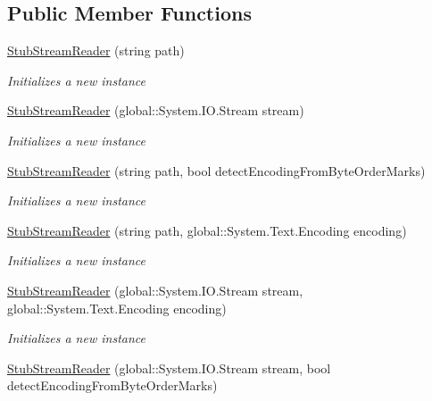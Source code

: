 \subsection*{Public Member Functions}
\begin{DoxyCompactItemize}
\item 
\hyperlink{class_system_1_1_i_o_1_1_fakes_1_1_stub_stream_reader_a5bb21911f4bb442b1e2476edf2af28b1}{Stub\-Stream\-Reader} (string path)
\begin{DoxyCompactList}\small\item\em Initializes a new instance\end{DoxyCompactList}\item 
\hyperlink{class_system_1_1_i_o_1_1_fakes_1_1_stub_stream_reader_a363441d31ffb0a17b02c0c676e2f003c}{Stub\-Stream\-Reader} (global\-::\-System.\-I\-O.\-Stream stream)
\begin{DoxyCompactList}\small\item\em Initializes a new instance\end{DoxyCompactList}\item 
\hyperlink{class_system_1_1_i_o_1_1_fakes_1_1_stub_stream_reader_a019c3c3375c7137875c2dac14cdfd247}{Stub\-Stream\-Reader} (string path, bool detect\-Encoding\-From\-Byte\-Order\-Marks)
\begin{DoxyCompactList}\small\item\em Initializes a new instance\end{DoxyCompactList}\item 
\hyperlink{class_system_1_1_i_o_1_1_fakes_1_1_stub_stream_reader_af43c78176a781cbe30486ab40d0b64e8}{Stub\-Stream\-Reader} (string path, global\-::\-System.\-Text.\-Encoding encoding)
\begin{DoxyCompactList}\small\item\em Initializes a new instance\end{DoxyCompactList}\item 
\hyperlink{class_system_1_1_i_o_1_1_fakes_1_1_stub_stream_reader_a95f211863d6581eb1ca1345c4aa459e7}{Stub\-Stream\-Reader} (global\-::\-System.\-I\-O.\-Stream stream, global\-::\-System.\-Text.\-Encoding encoding)
\begin{DoxyCompactList}\small\item\em Initializes a new instance\end{DoxyCompactList}\item 
\hyperlink{class_system_1_1_i_o_1_1_fakes_1_1_stub_stream_reader_a9e432b5d8eefccfd5b9a39b463612b26}{Stub\-Stream\-Reader} (global\-::\-System.\-I\-O.\-Stream stream, bool detect\-Encoding\-From\-Byte\-Order\-Marks)

\end{DoxyCompactItemize}

